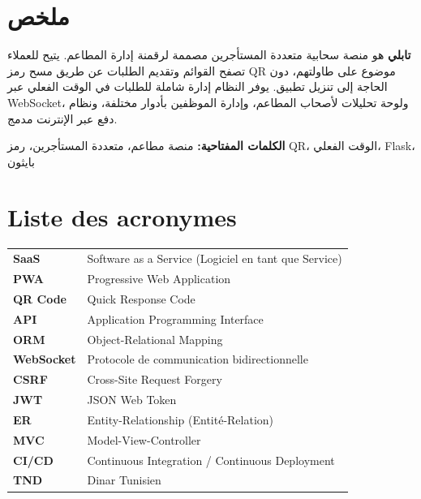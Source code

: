 \documentclass[12pt,a4paper]{report}
\begin{document}
\chapter*{ملخص}

\textbf{تابلي} هو منصة سحابية متعددة المستأجرين مصممة لرقمنة إدارة المطاعم. يتيح للعملاء تصفح القوائم وتقديم الطلبات عن طريق مسح رمز QR موضوع على طاولتهم، دون الحاجة إلى تنزيل تطبيق. يوفر النظام إدارة شاملة للطلبات في الوقت الفعلي عبر WebSocket، ولوحة تحليلات لأصحاب المطاعم، وإدارة الموظفين بأدوار مختلفة، ونظام دفع عبر الإنترنت مدمج.

\vspace{0.3cm}
\noindent\textbf{الكلمات المفتاحية:} منصة مطاعم، متعددة المستأجرين، رمز QR، الوقت الفعلي، Flask، بايثون

\cleardoublepage
\tableofcontents
\cleardoublepage

\listoffigures
{}
\cleardoublepage

\listoftables
{}
\cleardoublepage

\chapter*{Liste des acronymes}

\begin{tabularx}{\textwidth}{>{\bfseries}lp{}}
    \toprule
    SaaS & Software as a Service (Logiciel en tant que Service) \\
    PWA & Progressive Web Application \\
    QR Code & Quick Response Code \\
    API & Application Programming Interface \\
    ORM & Object-Relational Mapping \\
    WebSocket & Protocole de communication bidirectionnelle \\
    CSRF & Cross-Site Request Forgery \\
    JWT & JSON Web Token \\
    ER & Entity-Relationship (Entité-Relation) \\
    MVC & Model-View-Controller \\
    CI/CD & Continuous Integration / Continuous Deployment \\
    TND & Dinar Tunisien \\
    \bottomrule
\end{tabularx}
\end{document}
